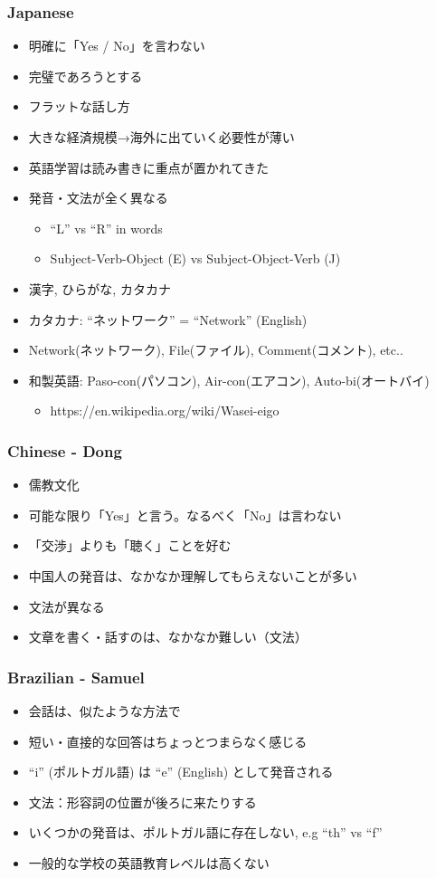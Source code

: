 \documentclass[aspectratio=169,11pt,hyperref={colorlinks=true}]{beamer}
\begin{document}
\begin{frame}
\frametitle{Japanese}
  \begin{itemize}
    \item 明確に「Yes / No」を言わない
    \item 完璧であろうとする
    \item フラットな話し方
    \item 大きな経済規模→海外に出ていく必要性が薄い
    \item 英語学習は読み書きに重点が置かれてきた
    \item 発音・文法が全く異なる
      \begin{itemize}
      \item ``L'' vs ``R'' in words
      \item Subject-Verb-Object (E) vs Subject-Object-Verb (J)
      \end{itemize}
    \item 漢字, ひらがな, カタカナ
    \item カタカナ: ``ネットワーク'' = ``Network'' (English)
    \item Network(ネットワーク), File(ファイル), Comment(コメント), etc..
    \item 和製英語: Paso-con(パソコン), Air-con(エアコン), Auto-bi(オートバイ)
      \begin{itemize}
        \item https://en.wikipedia.org/wiki/Wasei-eigo
      \end{itemize}
  \end{itemize}
\end{frame}

\begin{frame}
\frametitle{Chinese - Dong}
  \begin{itemize}
  \item 儒教文化
  \item 可能な限り「Yes」と言う。なるべく「No」は言わない
  \item 「交渉」よりも「聴く」ことを好む
  \item 中国人の発音は、なかなか理解してもらえないことが多い
  \item 文法が異なる
  \item 文章を書く・話すのは、なかなか難しい（文法）
  \end{itemize}
\end{frame}

\begin{frame}
\frametitle{Brazilian - Samuel}
  \begin{itemize}
  \item 会話は、似たような方法で
  \item 短い・直接的な回答はちょっとつまらなく感じる
  \item ``i'' (ポルトガル語) は ``e'' (English) として発音される
  \item 文法：形容詞の位置が後ろに来たりする
  \item いくつかの発音は、ポルトガル語に存在しない, e.g ``th'' vs ``f''
  \item 一般的な学校の英語教育レベルは高くない
  \end{itemize}
\end{frame}
\end{document}
